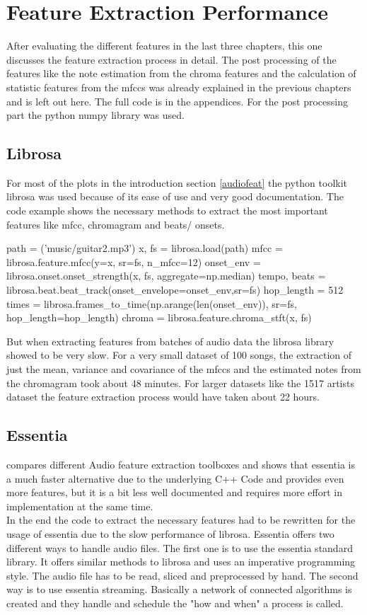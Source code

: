 \section{Feature Extraction Performance}

After evaluating the different features in the last three chapters, this one discusses the feature extraction process in detail. The post processing of the features like the note estimation from the chroma features and the calculation of statistic features from the mfccs was already explained in the previous chapters and is left out here. The full code is in the appendices. For the post processing part the python numpy library was used.  

\subsection{Librosa}

For most of the plots in the introduction section \ref{audiofeat} the python toolkit librosa was used because of its ease of use and very good documentation. The code example shows the necessary methods to extract the most important features like mfcc, chromagram and beats/ onsets.
\begin{pythonCode}
path = ('music/guitar2.mp3')
x, fs = librosa.load(path)
mfcc = librosa.feature.mfcc(y=x, sr=fs, n_mfcc=12)
onset_env = librosa.onset.onset_strength(x, fs, aggregate=np.median)
tempo, beats = librosa.beat.beat_track(onset_envelope=onset_env,sr=fs)
hop_length = 512
times = librosa.frames_to_time(np.arange(len(onset_env)), sr=fs, hop_length=hop_length)
chroma = librosa.feature.chroma_stft(x, fs)
\end{pythonCode}	
But when extracting features from batches of audio data the librosa library showed to be very slow. For a very small dataset of 100 songs, the extraction of just the mean, variance and covariance of the mfccs and the estimated notes from the chromagram took about 48 minutes. 
For larger datasets like the 1517 artists dataset the feature extraction process would have taken about 22 hours. 

\subsection{Essentia}

\cite{audiofeattoolb} compares different Audio feature extraction toolboxes and shows that essentia is a much faster alternative due to the underlying C++ Code and provides even more features, but it is a bit less well documented and requires more effort in implementation at the same time.\\ 
In the end the code to extract the necessary features had to be rewritten for the usage of essentia due to the slow performance of librosa. Essentia offers two different ways to handle audio files. The first one is to use the essentia standard library. It offers similar methods to librosa and uses an imperative programming style. The audio file has to be read, sliced and preprocessed by hand. 
The second way is to use essentia streaming. Basically a network of connected algorithms is created and they handle and schedule the "how and when" a process is called.

